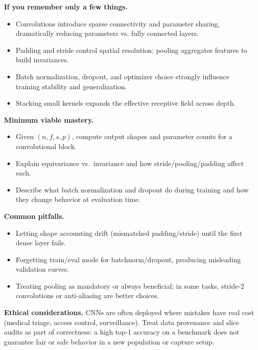 \begin{tcolorbox}[summarybox, title={Key takeaways}]
\textbf{If you remember only a few things.}
\begin{itemize}
    \item Convolutions introduce sparse connectivity and parameter sharing, dramatically reducing parameters vs. fully connected layers.
    \item Padding and stride control spatial resolution; pooling aggregates features to build invariances.
    \item Batch normalization, dropout, and optimizer choice strongly influence training stability and generalization.
    \item Stacking small kernels expands the effective receptive field across depth.
\end{itemize}

\medskip
\noindent\textbf{Minimum viable mastery.}
\begin{itemize}
    \item Given \((n, f, s, p)\), compute output shapes and parameter counts for a convolutional block.
    \item Explain equivariance vs.\ invariance and how stride/pooling/padding affect each.
    \item Describe what batch normalization and dropout do during training and how they change behavior at evaluation time.
\end{itemize}

\noindent\textbf{Common pitfalls.}
\begin{itemize}
    \item Letting shape accounting drift (mismatched padding/stride) until the first dense layer fails.
    \item Forgetting train/eval mode for batchnorm/dropout, producing misleading validation curves.
    \item Treating pooling as mandatory or always beneficial; in some tasks, stride-2 convolutions or anti-aliasing are better choices.
\end{itemize}

\medskip
\noindent\textbf{Ethical considerations.} CNNs are often deployed where mistakes have real cost (medical triage, access control, surveillance). Treat data provenance and slice audits as part of correctness: a high top\hyp{}1 accuracy on a benchmark does not guarantee fair or safe behavior in a new population or capture setup.
\end{tcolorbox}

